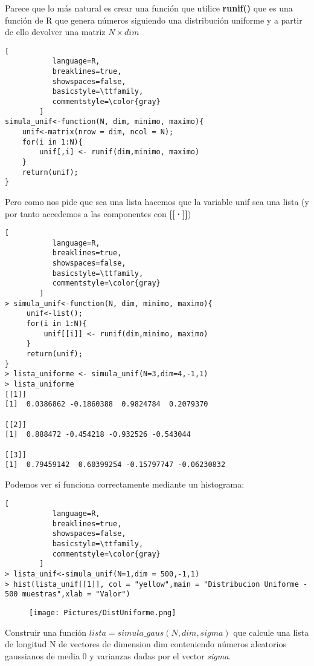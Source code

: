 \documentclass[11pt,fleqn]{book} %
\begin{document}
Parece que lo más natural es crear una función que utilice \textbf{runif()} que es una función de R que genera números siguiendo una distribución uniforme y a partir de ello devolver una matriz $N \times dim$
\begin{lstlisting}[
           language=R,
           breaklines=true,
           showspaces=false,
           basicstyle=\ttfamily,
           commentstyle=\color{gray}
        ]
simula_unif<-function(N, dim, minimo, maximo){
    unif<-matrix(nrow = dim, ncol = N);
    for(i in 1:N){
        unif[,i] <- runif(dim,minimo, maximo)
    }
    return(unif);
}
\end{lstlisting}
Pero como nos pide que sea una lista hacemos que la variable unif sea una lista (y por tanto accedemos a las componentes con \textbf{[[·]]})
\begin{lstlisting}[
           language=R,
           breaklines=true,
           showspaces=false,
           basicstyle=\ttfamily,
           commentstyle=\color{gray}
        ]
> simula_unif<-function(N, dim, minimo, maximo){
     unif<-list();
     for(i in 1:N){
         unif[[i]] <- runif(dim,minimo, maximo)
     }
     return(unif);
}
> lista_uniforme <- simula_unif(N=3,dim=4,-1,1)
> lista_uniforme
[[1]]
[1]  0.0386862 -0.1860388  0.9824784  0.2079370

[[2]]
[1]  0.888472 -0.454218 -0.932526 -0.543044

[[3]]
[1]  0.79459142  0.60399254 -0.15797747 -0.06230832
\end{lstlisting}
Podemos ver si funciona correctamente mediante un histograma:
\begin{lstlisting}[
           language=R,
           breaklines=true,
           showspaces=false,
           basicstyle=\ttfamily,
           commentstyle=\color{gray}
        ]
> lista_unif<-simula_unif(N=1,dim = 500,-1,1)
> hist(lista_unif[[1]], col = "yellow",main = "Distribucion Uniforme - 500 muestras",xlab = "Valor")
\end{lstlisting}

\begin{figure}[h]
\texttt{[image: Pictures/DistUniforme.png]}
\end{figure}

\begin{exercise}
Construir una función $lista = simula\_gaus(N,dim,sigma)$ que calcule una lista de longitud N de vectores de dimension dim conteniendo números aleatorios gaussianos de media 0  y varianzas dadas por el vector \textit{sigma}.
\end{exercise}
\end{document}
